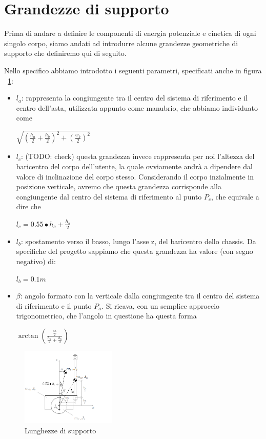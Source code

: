 \section{Grandezze di supporto}
Prima di andare a definire le componenti di energia potenziale e cinetica di ogni singolo corpo, siamo andati ad introdurre alcune grandezze geometriche di supporto che definiremo qui di seguito.

Nello specifico abbiamo introdotto i seguenti parametri, specificati anche in figura ~\ref{fig:VAB_lunghezze}:
\begin{itemize}
	\item \textbf{$l_a$}: rappresenta la congiungente tra il centro del sistema di riferimento e il centro dell'asta, utilizzata appunto come manubrio, che abbiamo individuato come
	\begin{center}
		{\Large $\sqrt{(\frac{h_a}{2} + \frac{h_b}{2})^2 + (\frac{w_b}{2})^2}$}
	\end{center}
	\item \textbf{$l_c$}: (TODO: check) questa grandezza invece rappresenta per noi l'altezza del baricentro del corpo dell'utente, la quale ovviamente andrà a dipendere dal valore di inclinazione del corpo stesso.
	Considerando il corpo inzialmente in posizione verticale, avremo che questa grandezza corrisponde alla congiungente dal centro del sistema di riferimento al punto $P_c$, che equivale a dire che
	\begin{center}
		$l_c = 0.55\bullet h_c + \frac{h_b}{2}$
	\end{center}
	\item \textbf{$l_b$}: spostamento verso il basso, lungo l'asse z, del baricentro dello chassis. Da specifiche del progetto sappiamo che questa grandezza ha valore (con segno negativo) di:
	\begin{center}
		$l_b = 0.1 m$
	\end{center}
	\item \textbf{$\beta$}: angolo formato con la verticale dalla congiungente tra il centro del sistema di riferimento e il punto $P_a$. Si ricava, con un semplice approccio trigonometrico, che l'angolo in questione ha questa forma
	\begin{center}
		$\arctan{(\frac{\frac{w_b}{2}}{\frac{h_a}{2} + \frac{h_b}{2}})}$
	\end{center}
\end{itemize}

\begin{figure}[h]
	\centering   	
	\includegraphics[width=0.4\textwidth]{Immagini/VAB_additionalMeasures.png}
	\caption{Lunghezze di supporto}
	\label{fig:VAB_lunghezze}
\end{figure}

